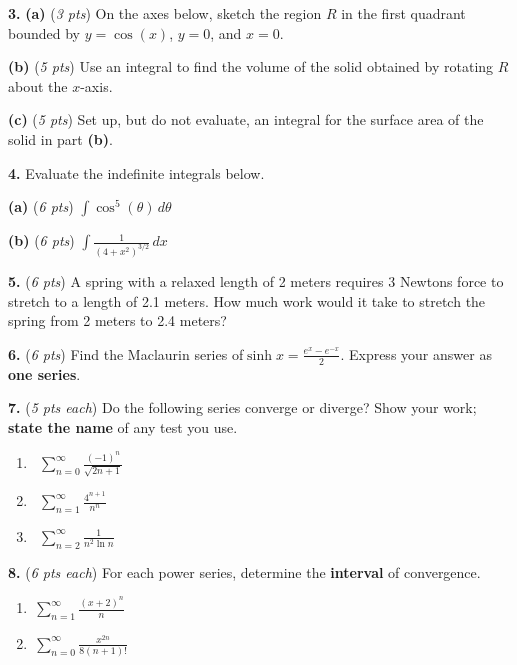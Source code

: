 \documentclass[12pt]{article}
\renewcommand{\emph}[1]{\textsf{\textbf{#1}}}
\let\ds\displaystyle
\newcommand{\prob}[1]{\bigskip\noindent\textbf{#1.} }
\newcommand{\pts}[1]{{\small (\textsl{#1})}}
\newcommand{\probpts}[2]{\prob{#1} \pts{#2 pts} \quad}
\newcommand{\ppartpts}[2]{\textbf{(#1)} \pts{#2 pts} \quad}
\newcommand{\epartpts}[2]{\medskip\noindent \textbf{(#1)} \pts{#2 pts} \quad}
\begin{document}
\newpage
\prob{3} \ppartpts{a}{3} On the axes below, sketch the region $R$ in the first quadrant bounded by $y=\cos(x)$, $y=0$, and $x=0$. \\


\epartpts{b}{5} Use an integral to find the volume  of the solid obtained by rotating $R$ about the $x$-axis.
\vfill

\epartpts{c}{5} Set up, but do not evaluate, an integral for the surface area of the solid in part \textbf{(b)}.
\vfill


\newpage
\prob{4}  Evaluate the indefinite integrals below.

\epartpts{a}{6} $\displaystyle{\int \cos^5(\theta) \, d\theta}$
\vfill

\epartpts{b}{6} $\displaystyle{\int \frac{1}{(4+x^2)^{3/2}} \, dx}$
\vfill


\newpage
\probpts{5}{6}  A spring with a relaxed length of 2 meters requires 3 Newtons force to stretch to a length of 2.1 meters.  How much work would it take to stretch the spring from 2 meters to 2.4 meters?
\vfill

\probpts{6}{6}  Find the Maclaurin series of\quad $\ds \sinh x = \frac{e^x - e^{-x}}{2}$.  Express your answer as \textbf{one series}.
\vfill


\newpage
\prob{7} \pts{5 pts each} \quad Do the following series converge or diverge? Show your work; \textbf{state the name} of any test you use.

\renewcommand{\labelenumi}{\textbf{(\alph{enumi})}}
	\begin{enumerate}[leftmargin=7mm]
	\item \, $\displaystyle{\sum_{n=0}^\infty \frac{(-1)^n}{\sqrt{2n+1}}}$
	\vfill
	\item \, $\displaystyle{\sum_{n=1}^\infty \frac{4^{n+1}}{n^n}}$
	\vfill
	\item \, $\displaystyle{\sum_{n=2}^\infty \frac{1}{n^2 \ln n}}$
	\vfill
	\end{enumerate}


\newpage
\prob{8} \pts{6 pts each} \quad For each power series, determine the \emph{interval} of convergence.
	\begin{enumerate}[leftmargin=7mm]
	\item \,$\displaystyle \sum_{n=1}^\infty \frac{(x+2)^n}{n}$
	\vfill
	\item \,$\displaystyle \sum_{n=0}^\infty \frac{x^{2n}}{8(n+1)!}$
	\vspace{3.0in}
	\end{enumerate}
\end{document}
